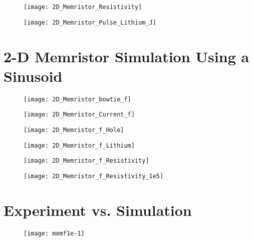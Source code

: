 \begin{doublespace}
\begin{figure}[!htp]
\centering
\texttt{[image: 2D\_Memristor\_Resistivity]}
\caption{} 
\label{}
\end{figure}



\begin{figure}[!htp]
\centering
\texttt{[image: 2D\_Memristor\_Pulse\_Lithium\_J]}
\caption{} 
\label{}
\end{figure}


\clearpage
\section{2-D Memristor Simulation Using a Sinusoid}

\begin{figure}[!htp]
\centering
\texttt{[image: 2D\_Memristor\_bowtie\_f]}
\caption{} 
\label{}
\end{figure}


\begin{figure}[!htp]
\centering
\texttt{[image: 2D\_Memristor\_Current\_f]}
\caption{} 
\label{}
\end{figure}

\begin{figure}[!htp]
\centering
\texttt{[image: 2D\_Memristor\_f\_Hole]}
\caption{} 
\label{}
\end{figure}

\begin{figure}[!htp]
\centering
\texttt{[image: 2D\_Memristor\_f\_Lithium]}
\caption{} 
\label{}
\end{figure}

\begin{figure}[!htp]
\centering
\texttt{[image: 2D\_Memristor\_f\_Resistivity]}
\caption{} 
\label{}
\end{figure}


\begin{figure}[!htp]
\centering
\texttt{[image: 2D\_Memristor\_f\_Resistivity\_1e5]}
\caption{} 
\label{}
\end{figure}

\clearpage
\section{Experiment vs. Simulation}


\begin{figure}[!htp]
\centering
\texttt{[image: memf1e-1]}
\caption{} 
\label{}
\end{figure}



\end{doublespace}
